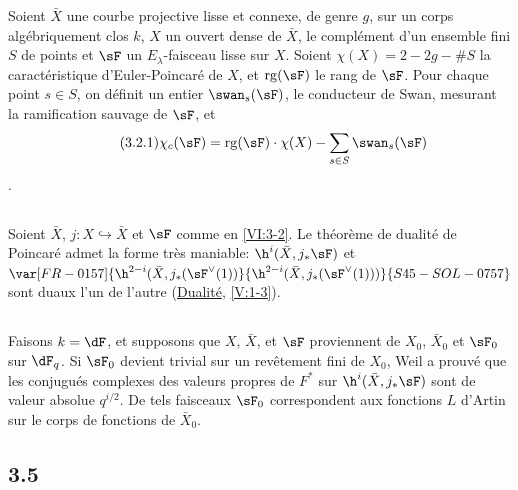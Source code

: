 Soient $\bar X$ une courbe projective lisse et connexe, de genre $g$, sur un 
corps algébriquement clos $k$, $X$ un ouvert dense de $\bar X$, 
le complément d'un ensemble fini $S$ de points et $\sF$ un 
$E_\lambda$-faisceau lisse sur $X$. Soient $\chi(X)=2-2 g-\# S$ la 
caractéristique d'Euler-Poincaré de $X$, et $\operatorname{rg}(\sF)$ le 
rang de $\sF$. Pour chaque point $s\in S$, on définit un entier 
$\swan_s(\sF)$, le conducteur de Swan, mesurant la ramification sauvage de 
$\sF$, et 
\begin{align*}\tag{3.2.1}\label{VI:eq:3-2-1}
  \chi_c(\sF) = \operatorname{rg}(\sF) \cdot \chi(X) - \sum_{s\in S} \swan_s(\sF) 
\end{align*}
. 





\subsection{}\label{VI:3-3}

Soient $\bar X$, $j:X\hookrightarrow\bar X$ et $\sF$ comme en \ref{VI:3-2}. Le 
théorème de dualité de Poincaré admet la forme très maniable: 
$\h^i(\bar X,j_\ast \sF)$ et $\var[FR-0157]{\h^{2-i}(\bar X,j_\ast(\sF^\vee(1))}{\h^{2-i}(\bar X,j_\ast(\sF^\vee(1)))}{S45-SOL-0757}$ sont 
duaux l'un de l'autre (\hyperref[V]{Dualité}, \ref{V:1-3}). 






\subsection{}\label{VI:3-4}

Faisons $k=\dF$, et supposons que $X$, $\bar X$, et $\sF$ proviennent de 
$X_0$, $\bar X_0$ et $\sF_0$ sur $\dF_q$. Si $\sF_0$ devient trivial sur un 
revêtement fini de $X_0$, Weil a prouvé que les conjugués complexes des 
valeurs propres de $F^\ast$ sur $\h^i(\bar X,j_\ast\sF)$ sont de valeur 
absolue $q^{i/2}$. De tels faisceaux $\sF_0$ correspondent aux fonctions $L$ 
d'Artin sur le corps de fonctions de $\bar X_0$. 





\subsection*{3.5}\label{VI:3-5_} %

